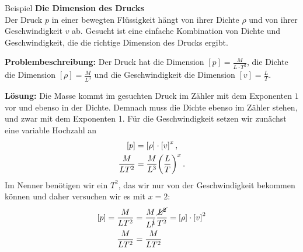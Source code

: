 \begin{examplebox}[]{Beispiel}
\textbf{Die Dimension des Drucks} \\
Der Druck $p$ in einer bewegten Flüssigkeit hängt von ihrer Dichte $\rho$ und von ihrer Geschwindigkeit $v$ ab. Gesucht ist eine einfache Kombination von Dichte und Geschwindigkeit, die die richtige Dimension des Drucks ergibt.

\textbf{Problembeschreibung:} Der Druck hat die Dimension $[p] = \frac{M}{L \cdot T^2}$, die Dichte die Dimension $[\rho] = \frac{M}{L^3}$ und die Geschwindigkeit die Dimension $[v] = \frac{L}{T}$.\newline

\textbf{Lösung:}
Die Masse kommt im gesuchten Druck im Zähler mit dem Exponenten $1$ vor und ebenso in der Dichte. Demnach muss die Dichte ebenso im Zähler stehen, und zwar mit dem Exponenten 1. Für die Geschwindigkeit setzen wir zunächst eine variable Hochzahl an 
\begin{equation*}\begin{aligned}
    [p] &= [\rho]\cdot {[v]}^x \mComma  \\
    \frac{M}{L T^2} &= \frac{M}{L^3} {\left(\frac{L}{T}\right)}^x \mDot \\
\end{aligned}\end{equation*} 
Im Nenner benötigen wir ein $T^2$, das wir nur von der Geschwindigkeit bekommen können und daher versuchen wir es mit $x = 2$: 
\begin{equation*}\begin{aligned}
    [p] = \frac{M}{L T^2} &= \frac{M}{L^{\cancel{3}}} \frac{\cancel{L^2}}{T^2} = [\rho]\cdot {[v]}^2\\
    \frac{M}{L T^2} &=  \frac{M}{L T^2}  
\end{aligned} \end{equation*}  \QEDA
\end{examplebox}

